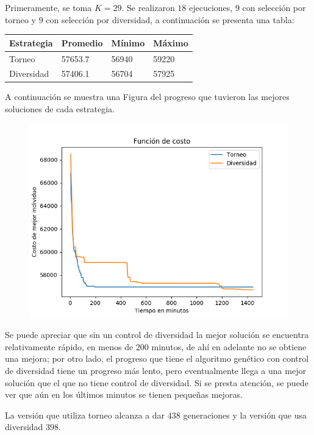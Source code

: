 \documentclass[10pt,a4paper]{article}
\begin{document}
\noindent Primeramente, se toma $K = 29$. Se realizaron $18$ ejecuciones, $9$ con selección por torneo y $9$ con selección por diversidad, a continuación se presenta una tabla:


\begin{table}[H]
\centering
\begin{tabular}{|l|l|l|l|}
\hline
Estrategia & Promedio & Mínimo & Máximo \\
\hline
Torneo & 57653.7 & 56940 & 59220 \\ 
Diversidad & 57406.1 & 56704 & 57925 \\
\hline
\end{tabular}
\end{table}

\noindent A continuación se muestra una Figura del progreso que tuvieron las mejores soluciones de cada estrategia.

\begin{figure}[H]
\centering
\includegraphics[scale=0.65]{1.png} 
\end{figure}

\noindent Se puede apreciar que sin un control de diversidad la mejor solución se encuentra relativamente rápido, en menos de $200$ minutos, de ahí en adelante no se obtiene una mejora; por otro lado, el progreso que tiene el algoritmo genético con control de diversidad tiene un progreso más lento, pero eventualmente llega a una mejor solución que el que no tiene control de diversidad. Si se presta atención, se puede ver que aún en los últimos minutos se tienen pequeñas mejoras.

\noindent La versión que utiliza torneo alcanza a dar $438$ generaciones y la versión que usa diversidad $398$. 
\end{document}
